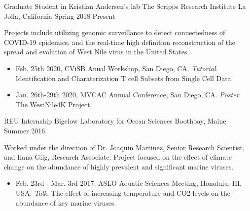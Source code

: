 

\begin{cventries}

  \cventry
    {Graduate Student in Kristian Andersen's lab} %
    {The Scripps Research Institute} %
    {La Jolla, California} %
    {Spring 2018-Present} %
    {
      \begin{cvitems} %
        \item {
          Projects include utilizing genomic surveillance to detect connectedness of COVID-19 epidemics, and the real-time high definition reconstruction of the spread and evolution of West Nile virus in the United States.
          \begin{itemize}
            \item{Feb. 25th 2020, CViSB Anual Workshop, San Diego, CA. \textit{Tutorial}. Identification and Charaterization T cell Subsets from Single Cell Data.}
            \item{Jan. 26th-29th 2020, MVCAC Annual Conference, San Diego, CA. \textit{Poster}. The WestNile4K Project.}
          \end{itemize}
        }
      \end{cvitems}
    }

  \cventry
    {REU Internship} %
    {Bigelow Laboratory for Ocean Sciences} %
    {Boothbay, Maine} %
    {Summer 2016} %
    {
      \begin{cvitems}
        \item{
          Worked under the direction of Dr. Joaquin Martinez, Senior Research Scientist, and Ilana Gilg, Research Associate.
          Project focused on the effect of climate change on the abundance of highly prevalent and significant marine viruses.
          \begin{itemize}
            \item{Feb. 23rd - Mar. 3rd 2017, ASLO Aquatic Sciences Meeting, Honolulu, HI, USA. \textit{Talk}. The effect of increasing temperature and CO2 levels on the abundance of key marine viruses.}
          \end{itemize}
        }
      \end{cvitems}
    }


\end{cventries}
